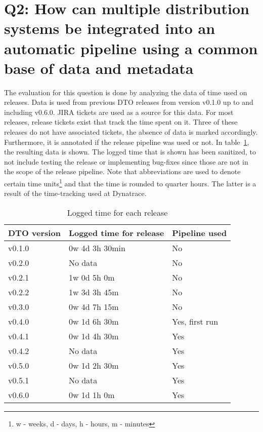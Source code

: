 \section{Q2: How can multiple distribution systems be integrated into an automatic pipeline using a common base of data and metadata}\label{sec:q2:-how-can-multiple-distribution-systems-be-integrated-into-an-automatic-pipeline-using-a-common-base-of-data-and-metadata}

The evaluation for this question is done by analyzing the data of time used on releases.
Data is used from previous DTO releases from version v0.1.0 up to and including v0.6.0.
JIRA tickets are used as a source for this data.
For most releases, release tickets exist that track the time spent on it.
Three of these releases do not have associated tickets, the absence of data is marked accordingly.
Furthermore, it is annotated if the release pipeline was used or not.
In table\ \ref{tab:logged-time-for-each-release}, the resulting data is shown.
The logged time that is shown has been sanitized, to not include testing the release or implementing bug-fixes since those are not in the scope of the release pipeline.
Note that abbreviations are used to denote certain time units\footnote{w - weeks, d - days, h - hours, m - minutes} and that the time is rounded to quarter hours.
The latter is a result of the time-tracking used at Dynatrace.

\begin{table}[h]
    \centering
    \caption{Logged time for each release}
    \label{tab:logged-time-for-each-release}
    \begin{tabular}{|l|l|l|}
        DTO version & Logged time for release & Pipeline used \\
        \hline
        v0.1.0 & 0w 4d 3h 30min & No \\
        v0.2.0 & No data & No \\
        v0.2.1 & 1w 0d 5h 0m & No \\
        v0.2.2 & 1w 3d 3h 45m & No \\
        v0.3.0 & 0w 4d 7h 15m & No \\
        v0.4.0 & 0w 1d 6h 30m & Yes, first run \\
        v0.4.1 & 0w 1d 4h 30m & Yes \\
        v0.4.2 & No data & Yes \\
        v0.5.0 & 0w 1d 2h 30m & Yes \\
        v0.5.1 & No data & Yes \\
        v0.6.0 & 0w 1d 1h 0m & Yes \\
    \end{tabular}
\end{table}

